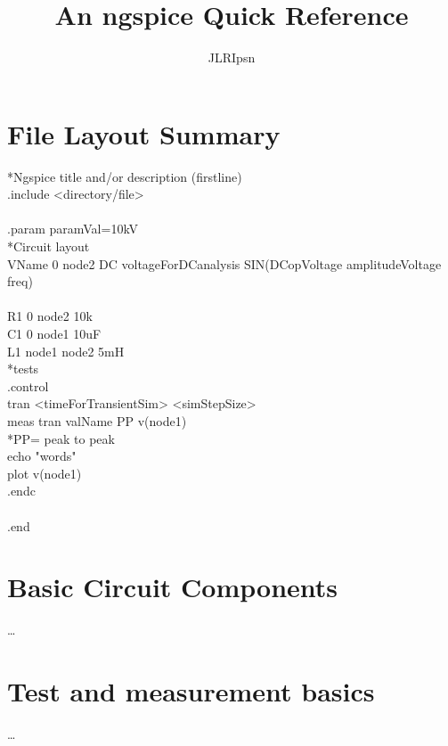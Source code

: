 \documentclass{article}
\author{JLRIpsn}
\title{An ngspice Quick Reference}
\begin{document}
\maketitle
\section{File Layout Summary}

*Ngspice title and/or description (firstline) \\
.include <directory/file>\\
\\
.param paramVal=10kV\\
*Circuit layout\\
VName 0 node2 DC voltageForDCanalysis SIN(DCopVoltage amplitudeVoltage freq)\\
\\
R1 0 node2 10k\\
C1 0 node1 10uF\\
L1 node1 node2 5mH\\

*tests\\
.control\\
tran <timeForTransientSim> <simStepSize>\\
meas tran valName PP v(node1)\\
*PP= peak to peak\\
echo "words"\\
plot v(node1)\\
.endc\\
\\
.end\\
\section{Basic Circuit Components}
\ldots{}
\section{Test and measurement basics}
\ldots{}
\end{document}
